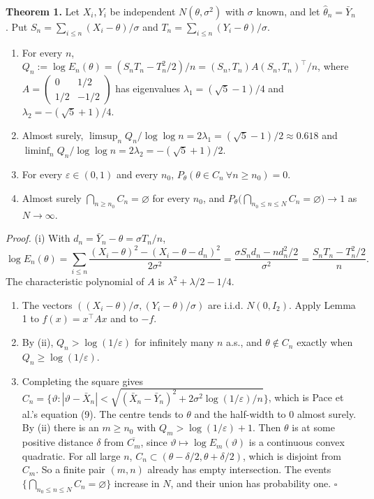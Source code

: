 \documentclass[
  10pt,
  a4paper,
]{article}
\begin{document}
\textbf{Theorem 1.} Let \(X_i,Y_i\) be independent
\(N(\theta,\sigma^2)\) with \(\sigma\) known, and let
\(\hat\theta_n=\bar Y_n\). Put \(S_n=\sum_{i\le n}(X_i-\theta)/\sigma\)
and \(T_n=\sum_{i\le n}(Y_i-\theta)/\sigma\).

\begin{enumerate}
\def\labelenumi{(\roman{enumi})}
\item
  For every \(n\),
  \(Q_n:=\log E_n(\theta)=(S_nT_n-T_n^2/2)/n=(S_n,T_n)A(S_n,T_n)^\top/n\),
  where \(A=\begin{pmatrix}0&1/2\\1/2&-1/2\end{pmatrix}\) has
  eigenvalues \(\lambda_1=(\sqrt5-1)/4\) and
  \(\lambda_2=-(\sqrt5+1)/4\).
\item
  Almost surely,
  \(\limsup_nQ_n/\log\log n=2\lambda_1=(\sqrt5-1)/2\approx0.618\) and
  \(\liminf_nQ_n/\log\log n=2\lambda_2=-(\sqrt5+1)/2\).
\item
  For every \(\varepsilon\in(0,1)\) and every \(n_0\),
  \(P_\theta(\theta\in C_n\ \forall n\ge n_0)=0\).
\item
  Almost surely \(\bigcap_{n\ge n_0}C_n=\varnothing\) for every \(n_0\),
  and \(P_\theta\big(\bigcap_{n_0\le n\le N}C_n=\varnothing\big)\to1\)
  as \(N\to\infty\).
\end{enumerate}

\emph{Proof.} (i) With \(d_n=\bar Y_n-\theta=\sigma T_n/n\),
\[\log E_n(\theta)=\sum_{i\le n}\frac{(X_i-\theta)^2-(X_i-\theta-d_n)^2}{2\sigma^2}=\frac{\sigma S_nd_n-nd_n^2/2}{\sigma^2}=\frac{S_nT_n-T_n^2/2}{n}.\]
The characteristic polynomial of \(A\) is \(\lambda^2+\lambda/2-1/4\).

\begin{enumerate}
\def\labelenumi{(\roman{enumi})}
\setcounter{enumi}{1}
\item
  The vectors \(((X_i-\theta)/\sigma,(Y_i-\theta)/\sigma)\) are i.i.d.
  \(N(0,I_2)\). Apply Lemma 1 to \(f(x)=x^\top Ax\) and to \(-f\).
\item
  By (ii), \(Q_n>\log(1/\varepsilon)\) for infinitely many \(n\) a.s.,
  and \(\theta\notin C_n\) exactly when \(Q_n\ge\log(1/\varepsilon)\).
\item
  Completing the square gives
  \(C_n=\big\{\vartheta:|\vartheta-\bar X_n|<\sqrt{(\bar X_n-\bar Y_n)^2+2\sigma^2\log(1/\varepsilon)/n}\big\}\),
  which is Pace et al.'s equation (9). The centre tends to \(\theta\)
  and the half-width to \(0\) almost surely. By (ii) there is an
  \(m\ge n_0\) with \(Q_m>\log(1/\varepsilon)+1\). Then \(\theta\) is at
  some positive distance \(\delta\) from \(\overline{C_m}\), since
  \(\vartheta\mapsto\log E_m(\vartheta)\) is a continuous convex
  quadratic. For all large \(n\),
  \(C_n\subset(\theta-\delta/2,\theta+\delta/2)\), which is disjoint
  from \(C_m\). So a finite pair \((m,n)\) already has empty
  intersection. The events
  \(\{\bigcap_{n_0\le n\le N}C_n=\varnothing\}\) increase in \(N\), and
  their union has probability one. \(\square\)
\end{enumerate}
\end{document}
